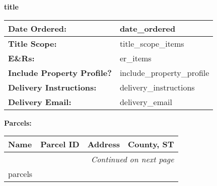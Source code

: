 \documentclass[12pt]{article}
\begin{document}
\setlength{\parindent}{0pt}
\setlength{\tabcolsep}{3pt}

\begin{center}
\Large\textbf{{{title}}}
\end{center}

\vspace{1em}
\noindent
{\setlength{\baselineskip}{0em}%
 \setlength{\parskip}{0pt}%
\begin{tabular}{>{\raggedleft\arraybackslash}m{1.8in}|m{5.5in}}
    \textbf{Date Ordered:} & {{date_ordered}} \\ \hline
    \textbf{Title Scope:} & {{title_scope_items}} \\ \hline
    \textbf{E\&Rs:} & {{er_items}} \\ \hline
    \textbf{Include Property Profile?} & {{include_property_profile}} \\ \hline
    \textbf{Delivery Instructions:} & {{delivery_instructions}} \\ \hline
    \textbf{Delivery Email:} & {{delivery_email}} \\ \hline
\end{tabular}}

\vspace{1em}
\noindent\textbf{Parcels:}
\vspace{0.5em}

\noindent
{}
\begin{longtable}{|l|l|l|l|}
    \hline
    \textbf{Name} & \textbf{Parcel ID} & \textbf{Address} & \textbf{County, ST} \\
    \hline
    \endhead
    
    \hline
    \multicolumn{4}{|r|}{\textit{Continued on next page}} \\
    \hline
    \endfoot
    
    \hline
    \endlastfoot
    
    {{parcels}}
\end{longtable}
\end{document}

